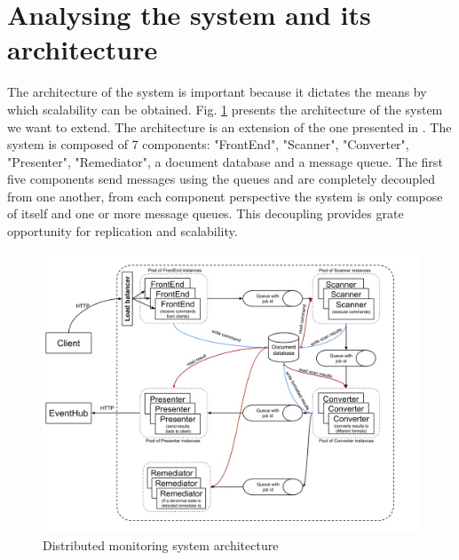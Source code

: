 \section{Analysing the system and its architecture}
\label{sec:architecture}
The architecture of the system is important because it dictates the means by which scalability can be obtained. Fig. \ref{fig:systemArchitecture} presents the architecture of the system we want to extend. The architecture is an extension of the one presented in \cite{IrimieAndPetcu}. The system is composed of 7 components: "FrontEnd", "Scanner", "Converter", "Presenter", "Remediator", a document database and a message queue. The first five components send messages using the queues and are completely decoupled from one another, from each component perspective the system is only compose of itself and one or more message queues. This decoupling provides grate opportunity for replication and scalability.

\begin{figure}[ht]
\centering
\includegraphics[width=\linewidth]{./img/MonitoringSystemArchitectureRemediation.png}
\caption{Distributed monitoring system architecture}
\label{fig:systemArchitecture}
\end{figure}

